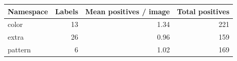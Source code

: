 \begin{tabular}{lrrr}
\toprule
Namespace & Labels & Mean positives / image & Total positives \\
\midrule
color & 13 & 1.34 & 221 \\
extra & 26 & 0.96 & 159 \\
pattern & 6 & 1.02 & 169 \\
\bottomrule
\end{tabular}
